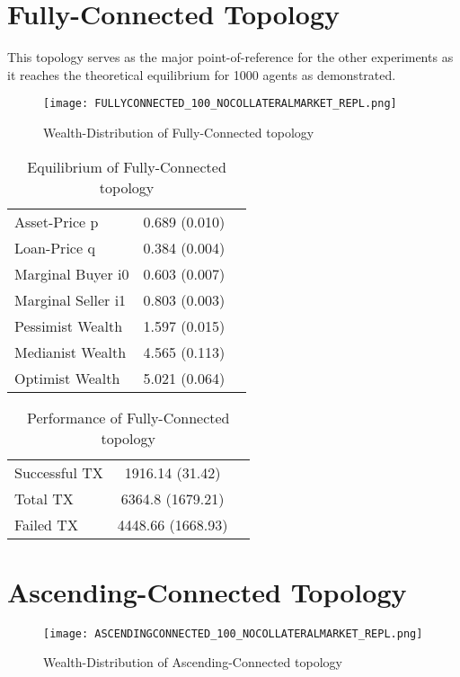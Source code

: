 \documentclass[Bachelorarbeit.tex]{subfiles}
\begin{document}
\section{Fully-Connected Topology}
This topology serves as the major point-of-reference for the other experiments as it reaches the theoretical equilibrium for 1000 agents as demonstrated.

\begin{figure}[H]
	\centering
  \texttt{[image: FULLYCONNECTED\_100\_NOCOLLATERALMARKET\_REPL.png]}
	\caption{Wealth-Distribution of Fully-Connected topology}
	\label{fig:wealth_FULLYCONNECTED_100_NOCOLLATERALMARKET_REPL}
\end{figure}

\begin{table}[h]
	\caption{Equilibrium of Fully-Connected topology}
	\centering
	\begin{tabular} { l c r }
		\hline
		Asset-Price p & 0.689 (0.010) \\
		Loan-Price q & 0.384 (0.004) \\
		Marginal Buyer i0 & 0.603 (0.007) \\
		Marginal Seller i1 & 0.803 (0.003) \\
		\hline
		Pessimist Wealth & 1.597 (0.015) \\
		Medianist Wealth & 4.565 (0.113) \\
		Optimist Wealth & 5.021 (0.064) \\
		\hline
	\end{tabular}
	\label{tab:fullyconnected_equilibrium_100Agents_05Bond}
\end{table} 

\begin{table}[h]
	\caption{Performance of Fully-Connected topology}
	\centering
	\begin{tabular} { l c r }
		\hline
		Successful TX & 1916.14 (31.42) \\
		Total TX & 6364.8 (1679.21) \\
		Failed TX & 4448.66 (1668.93) \\
		\hline
	\end{tabular}
\end{table}


\section{Ascending-Connected Topology} 

\begin{figure}[H]
	\centering
  \texttt{[image: ASCENDINGCONNECTED\_100\_NOCOLLATERALMARKET\_REPL.png]}
	\caption{Wealth-Distribution of Ascending-Connected topology}
	\label{fig:wealth_ASCENDINGCONNECTED_100_NOCOLLATERALMARKET_REPL}
\end{figure}
\end{document}
